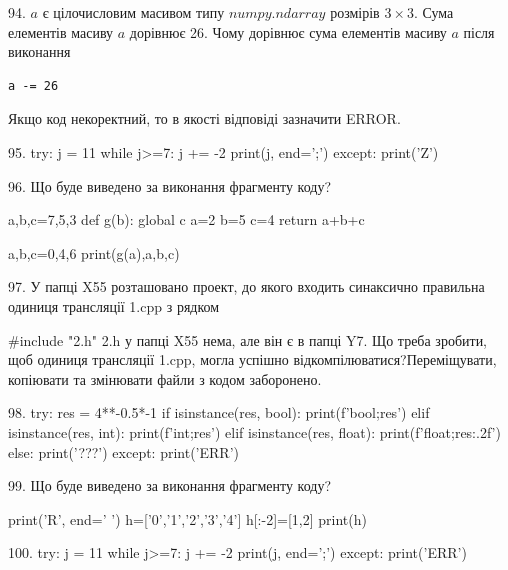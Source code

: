 \documentclass[11pt]{article}
\begin{document}
94. 
$a$ є цілочисловим масивом типу $numpy.ndarray$ розмірів $3{\times}3$. Сума елементів масиву $a$ дорівнює 26. Чому дорівнює сума елементів масиву $a$ після виконання 
\begin{verbatim}
a -= 26
\end{verbatim}


Якщо код некоректний, то в якості відповіді зазначити ERROR.



95. 
try:
    j = 11
    while j>=7:
        j += -2
    print(j, end=';')
except:
    print('Z')

96. Що буде виведено за виконання фрагменту коду?

a,b,c=7,5,3
def g(b):
global c    a=2
    b=5
    c=4
    return a+b+c

a,b,c=0,4,6
print(g(a),a,b,c)

97. 
У папці X55 розташовано проект, до якого входить синаксично правильна одиниця трансляції 1.cpp з рядком\par
{\#}include "2.h"
 2.h у папці X55 нема, але він є в папці Y7. Що треба зробити, щоб одиниця трансляції 1.cpp, могла успішно відкомпілюватися?Переміщувати, копіювати та змінювати файли з кодом заборонено.\par\vspace{1.5cm}
98. 
try:
    res = 4**-0.5*-1
    if isinstance(res, bool):
        print(f'bool;{res}')
    elif isinstance(res, int):
        print(f'int;{res}')
    elif isinstance(res, float):
        print(f'float;{res:.2f}')
    else:
        print('???')
except:
    print('ERR')

99. Що буде виведено за виконання фрагменту коду?

print('R', end=' ')
h=['0','1','2','3','4']
h[:-2]=[1,2]
print(h)


100. 
try:
    j = 11
    while j>=7:
        j += -2
    print(j, end=';')
except:
    print('ERR')
\end{document}
